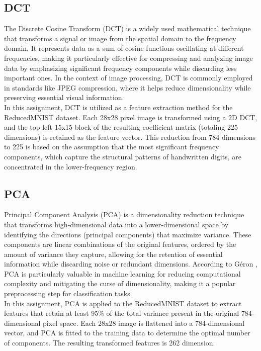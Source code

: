 \documentclass[12pt]{article}
\begin{document}
\subsection{DCT}
The Discrete Cosine Transform (DCT) is a widely used mathematical technique that transforms a signal or image from the spatial domain to the frequency domain. It represents data as a sum of cosine functions oscillating at different frequencies, making it particularly effective for compressing and analyzing image data by emphasizing significant frequency components while discarding less important ones. In the context of image processing, DCT is commonly employed in standards like JPEG compression, where it helps reduce dimensionality while preserving essential visual information.\\
In this assignment, DCT is utilized as a feature extraction method for the ReducedMNIST dataset. Each 28x28 pixel image is transformed using a 2D DCT, and the top-left 15x15 block of the resulting coefficient matrix (totaling 225 dimensions) is retained as the feature vector. This reduction from 784 dimensions to 225 is based on the assumption that the most significant frequency components, which capture the structural patterns of handwritten digits, are concentrated in the lower-frequency region.

\subsection{PCA}
Principal Component Analysis (PCA) is a dimensionality reduction technique that transforms high-dimensional data into a lower-dimensional space by identifying the directions (principal components) that maximize variance. These components are linear combinations of the original features, ordered by the amount of variance they capture, allowing for the retention of essential information while discarding noise or redundant dimensions. According to Géron \cite{geron2019}, PCA is particularly valuable in machine learning for reducing computational complexity and mitigating the curse of dimensionality, making it a popular preprocessing step for classification tasks.\\
In this assignment, PCA is applied to the ReducedMNIST dataset to extract features that retain at least 95\% of the total variance present in the original 784-dimensional pixel space. Each 28x28 image is flattened into a 784-dimensional vector, and PCA is fitted to the training data to determine the optimal number of components. The resulting transformed features is 262 dimension.
\end{document}
